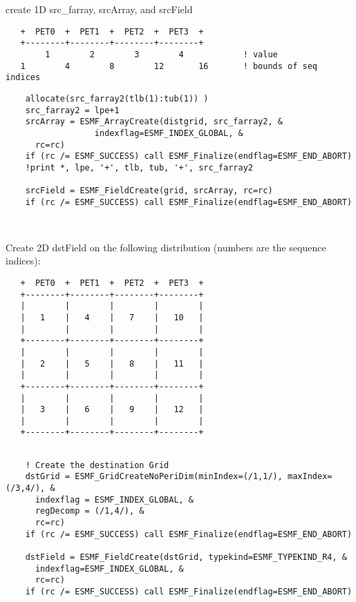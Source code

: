 
   create 1D src\_farray, srcArray, and srcField
  \begin{verbatim}
   +  PET0  +  PET1  +  PET2  +  PET3  +
   +--------+--------+--------+--------+
        1        2        3        4            ! value
   1        4        8        12       16       ! bounds of seq indices
  \end{verbatim} 

 \begin{verbatim}
    allocate(src_farray2(tlb(1):tub(1)) )
    src_farray2 = lpe+1
    srcArray = ESMF_ArrayCreate(distgrid, src_farray2, &
                  indexflag=ESMF_INDEX_GLOBAL, &
      rc=rc)
    if (rc /= ESMF_SUCCESS) call ESMF_Finalize(endflag=ESMF_END_ABORT)
    !print *, lpe, '+', tlb, tub, '+', src_farray2

    srcField = ESMF_FieldCreate(grid, srcArray, rc=rc)
    if (rc /= ESMF_SUCCESS) call ESMF_Finalize(endflag=ESMF_END_ABORT)

 
\end{verbatim}
 

   Create 2D dstField on the following distribution
   (numbers are the sequence indices):
  \begin{verbatim}
   +  PET0  +  PET1  +  PET2  +  PET3  +
   +--------+--------+--------+--------+
   |        |        |        |        |
   |   1    |   4    |   7    |   10   |
   |        |        |        |        |
   +--------+--------+--------+--------+
   |        |        |        |        |
   |   2    |   5    |   8    |   11   |
   |        |        |        |        |
   +--------+--------+--------+--------+
   |        |        |        |        |
   |   3    |   6    |   9    |   12   |
   |        |        |        |        |
   +--------+--------+--------+--------+
  \end{verbatim} 

 \begin{verbatim}

    ! Create the destination Grid
    dstGrid = ESMF_GridCreateNoPeriDim(minIndex=(/1,1/), maxIndex=(/3,4/), &
      indexflag = ESMF_INDEX_GLOBAL, &
      regDecomp = (/1,4/), &
      rc=rc)
    if (rc /= ESMF_SUCCESS) call ESMF_Finalize(endflag=ESMF_END_ABORT)

    dstField = ESMF_FieldCreate(dstGrid, typekind=ESMF_TYPEKIND_R4, &
      indexflag=ESMF_INDEX_GLOBAL, &
      rc=rc)
    if (rc /= ESMF_SUCCESS) call ESMF_Finalize(endflag=ESMF_END_ABORT)
 
\end{verbatim}
 
